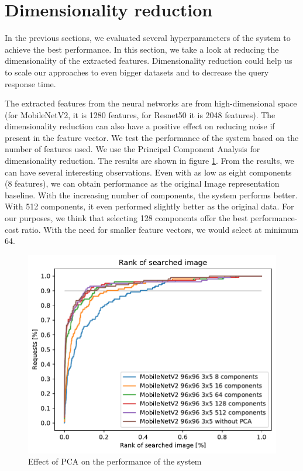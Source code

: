 \section{Dimensionality reduction}

In the previous sections, we evaluated several hyperparameters of the system to achieve the best performance. In this section, we take a look at reducing the dimensionality of the extracted features. Dimensionality reduction could help us to scale our approaches to even bigger datasets and to decrease the query response time.

The extracted features from the neural networks are from high-dimensional space (for MobileNetV2, it is 1280 features, for Resnet50 it is 2048 features). The dimensionality reduction can also have a positive effect on reducing noise if present in the feature vector. We test the performance of the system based on the number of features used. We use the Principal Component Analysis for dimensionality reduction. The results are shown in figure \ref{fig:pca}. From the results, we can have several interesting observations. Even with as low as eight components (8 features), we can obtain performance as the original Image representation baseline. With the increasing number of components, the system performs better. With 512 components, it even performed slightly better as the original data. For our purposes, we think that selecting 128 components offer the best performance-cost ratio. With the need for smaller feature vectors, we would select at minimum 64.

\begin{figure}
    \centering
    \includegraphics[width=0.8\linewidth]{graphs/6fbd4f70810e1f63f400ef601c1cdba0fd1635749810aa2347a4ff26e6fccf47.pdf}
    \caption{Effect of PCA on the performance of the system}
    \label{fig:pca}
\end{figure}

